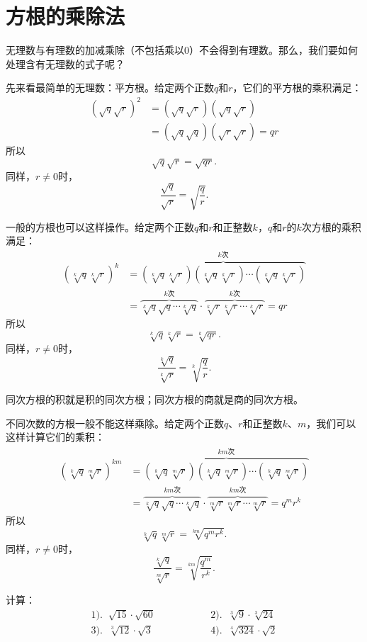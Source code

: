 \documentclass[12pt,UTF8,fontset=none]{ctexbook}
\begin{document}
\section{方根的乘除法}

无理数与有理数的加减乘除（不包括乘以$0$）不会得到有理数。那么，我们要如何处理含有无理数的式子呢？

先来看最简单的无理数：平方根。给定两个正数$q$和$r$，它们的平方根的乘积满足：
\begin{align*}
    \left(\sqrt{q}\sqrt{r}\right)^2 &=  \left(\sqrt{q}\sqrt{r}\right)\left(\sqrt{q}\sqrt{r}\right)  \\
    &= \left(\sqrt{q}\sqrt{q}\right)\left(\sqrt{r}\sqrt{r}\right) = qr  
\end{align*}
所以
$$\sqrt{q}\sqrt{r} = \sqrt{qr}.$$
同样，$r \neq 0$时，
$$\frac{\sqrt{q}}{\sqrt{r}} = \sqrt{\frac{q}{r}}.$$

一般的方根也可以这样操作。给定两个正数$q$和$r$和正整数$k$，$q$和$r$的$k$次方根的乘积满足：
\begin{align*}
    \left(\sqrt[k]{q}\sqrt[k]{r}\right)^k &= \overbrace{\left(\sqrt[k]{q}\sqrt[k]{r}\right)\left(\sqrt[k]{q}\sqrt[k]{r}\right) \cdots \left(\sqrt[k]{q}\sqrt[k]{r}\right)}^{k\mbox{次}}   \\
    &= \overbrace{\sqrt[k]{q}\sqrt{q}\cdots \sqrt[k]{q}}^{k\mbox{次}}\cdot\overbrace{\sqrt[k]{r}\sqrt[k]{r}\cdots \sqrt[k]{r}}^{k\mbox{次}} = qr  
\end{align*}
所以
$$\sqrt[k]{q}\sqrt[k]{r} = \sqrt[k]{qr}.$$
同样，$r \neq 0$时，
$$\frac{\sqrt[k]{q}}{\sqrt[k]{r}} = \sqrt[k]{\frac{q}{r}}.$$

同次方根的积就是积的同次方根；同次方根的商就是商的同次方根。

不同次数的方根一般不能这样乘除。给定两个正数$q$、$r$和正整数$k$、$m$，我们可以这样计算它们的乘积：
\begin{align*}
    \left(\sqrt[k]{q}\sqrt[m]{r}\right)^{km} &= \overbrace{\left(\sqrt[k]{q}\sqrt[m]{r}\right)\left(\sqrt[k]{q}\sqrt[m]{r}\right) \cdots \left(\sqrt[k]{q}\sqrt[m]{r}\right)}^{km\mbox{次}}   \\
    &= \overbrace{\sqrt[k]{q}\sqrt{q}\cdots \sqrt[k]{q}}^{km\mbox{次}}\cdot\overbrace{\sqrt[m]{r}\sqrt[m]{r}\cdots \sqrt[m]{r}}^{km\mbox{次}} = q^mr^k  
\end{align*}
所以
$$\sqrt[k]{q}\sqrt[m]{r} = \sqrt[km]{q^mr^k}.$$
同样，$r \neq 0$时，
$$\frac{\sqrt[k]{q}}{\sqrt[m]{r}} = \sqrt[km]{\frac{q^m}{r^k}}.$$

\begin{et}
    计算：\\
    $$
    \begin{array}{lll}
       1).\;\; \displaystyle  \sqrt{15}\cdot\sqrt{60} &  \phantom{00000000} & 2).\;\; \displaystyle \sqrt[3]{9}\cdot\sqrt[3]{24} \\[2em]
       3).\;\; \displaystyle \sqrt[3]{12}\cdot\sqrt{3} &  \phantom{00000000} & 4).\;\; \displaystyle \sqrt[4]{324}\cdot\sqrt{2}
    \end{array}
    $$
\end{et}
\end{document}

